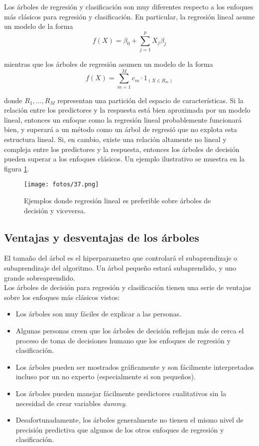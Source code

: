 Los árboles de regresión y clasificación son muy diferentes respecto a los enfoques más clásicos para regresión y clasificación. En particular, la regresión lineal asume un modelo de la forma
\begin{equation}
f(X) = \beta_0 + \sum_{j=1}^{p} X_j \beta_j
\end{equation}

\noindent mientras que los árboles de regresión asumen un modelo de la forma
\begin{equation}
f(X) = \sum_{m=1}^{M} c_m \cdot 1_{(X \in R_m)}
\end{equation}

donde $R_1, \ldots, R_M$ representan una partición del espacio de características. Si la relación entre los predictores y la respuesta está bien aproximada por un modelo lineal, entonces un enfoque como la regresión lineal probablemente funcionará bien, y superará a un método como un árbol de regresió que no explota esta estructura lineal. Si, en cambio, existe una relación altamente no lineal y compleja entre los predictores y la respuesta, entonces los árboles de decisión pueden superar a los enfoques clásicos. Un ejemplo ilustrativo se muestra en la figura \ref{fig:6.88}. 

\begin{figure}[h]
\centering
\texttt{[image: fotos/37.png]}
\caption{Ejemplos donde regresión lineal es preferible sobre árboles de decisión y viceversa.}
\label{fig:6.88}
\end{figure}

\subsection{Ventajas y desventajas de los árboles}

El tamaño del árbol es el hiperparametro que controlará el subaprendizaje o subaprendizaje del algoritmo. Un árbol pequeño estará subaprendido, y uno grande sobreaprendido. \\

Los árboles de decisión para regresión y clasificación tienen una serie de ventajas sobre los enfoques más clásicos vistos:
\begin{itemize}
    \item Los árboles son muy fáciles de explicar a las personas.
    \item Algunas personas creen que los árboles de decisión reflejan más de cerca el proceso de toma de decisiones humano que los enfoques de regresión y clasificación.
    \item Los árboles pueden ser mostrados gráficamente y son fácilmente interpretados incluso por un no experto (especialmente si son pequeños).
    \item Los árboles pueden manejar fácilmente predictores cualitativos sin la necesidad de crear variables \textit{dummy}.
    \item Desafortunadamente, los árboles generalmente no tienen el mismo nivel de precisión predictiva que algunos de los otros enfoques de regresión y clasificación.
\end{itemize}

